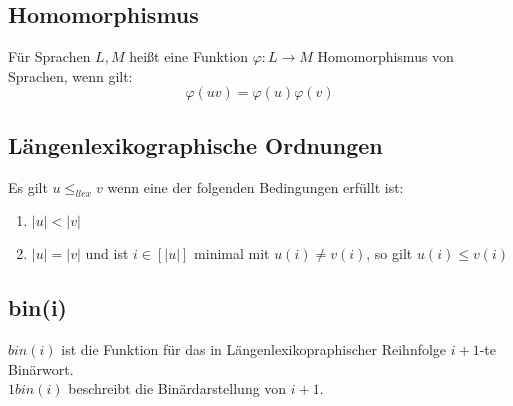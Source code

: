\subsection{Homomorphismus}
    Für Sprachen \(L,M\) heißt eine Funktion \(\varphi:L\to M\) 
    Homomorphismus von Sprachen, wenn gilt: \[\varphi(uv) = \varphi(u)\varphi(v)\]
\subsection{Längenlexikographische Ordnungen}
    Es gilt \(u \leq_{llex} v\) wenn eine der folgenden Bedingungen erfüllt ist:
    \begin{enumerate}
        \item \(|u|<|v|\)
        \item \(|u|=|v|\) und ist \(i\in[|u|]\) minimal mit \(u(i)\ne v(i)\), so gilt \(u(i)\leq v(i)\)
    \end{enumerate}
\subsection{bin(i)}
\(bin(i)\) ist die Funktion für das in Längenlexikopraphischer Reihnfolge \(i+1\)-te Binärwort.\\
\(1bin(i)\) beschreibt die Binärdarstellung von \(i+1\).